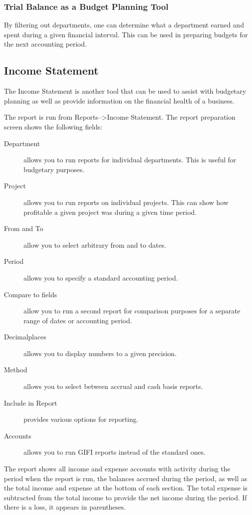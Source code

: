 \documentclass{article}
\begin{document}
\subsubsection{Trial Balance as a Budget Planning Tool}
By filtering out departments, one can determine what a department earned and
spent during a given financial interval.  This can be used in preparing budgets
for the next accounting period.

\subsection{Income Statement}
The Income Statement is another tool that can be used to assist with budgetary
planning as well as provide information on the financial health of a business.

The report is run from Reports--\textgreater Income Statement.  The report
preparation screen shows the following fields:

\begin{description}
\item[Department] allows you to run reports for individual departments.  This is
useful for budgetary purposes.
\item[Project] allows you to run reports on individual projects.  This can show
how profitable a given project was during a given time period.
\item[From and To] allow you to select arbitrary from and to dates.
\item[Period] allows you to specify a standard accounting period.
\item[Compare to fields] allow you to run a second report for comparison
purposes for a separate range of dates or accounting period.
\item[Decimalplaces] allows you to display numbers to a given precision.
\item[Method] allows you to select between accrual and cash basis reports.
\item[Include in Report] provides various options for reporting.
\item[Accounts] allows you to run GIFI reports instead of the standard ones.
\end{description}

The report shows all income and expense accounts with activity during the period
when the report is run, the balances accrued during the period, as well as the
total income and expense at the bottom of each section.  The total expense is
subtracted from the total income to provide the net income during the period.
If there is a loss, it appears in parentheses.
\end{document}
